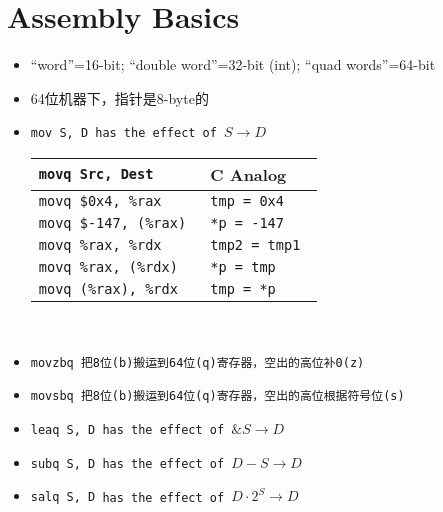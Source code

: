 \section{Assembly Basics}
\begin{itemize}[nosep]
    \item ``word''=16-bit; ``double word''=32-bit (int); ``quad words''=64-bit
    \item 64位机器下，指针是8-byte的
    \item \tt{mov S, D} has the effect of $S \to D$
    
    \begin{tabular}{| l || l |} \hline
        \tt{movq Src, Dest} & C Analog \\ \hline
        \tt{movq \$0x4, \%rax} & \tt{tmp = 0x4} \\ \hline
        \tt{movq \$-147, (\%rax)} & \tt{*p = -147} \\ \hline
        \tt{movq \%rax, \%rdx} & \tt{tmp2 = tmp1} \\ \hline
        \tt{movq \%rax, (\%rdx)} & \tt{*p = tmp} \\ \hline
        \tt{movq (\%rax), \%rdx} & \tt{tmp = *p} \\ \hline
    \end{tabular} \\
    \item \tt{movzbq} 把8位(b)搬运到64位(q)寄存器，空出的高位补0(z)
    \item \tt{movsbq} 把8位(b)搬运到64位(q)寄存器，空出的高位根据符号位(s)
    \item \tt{leaq S, D} has the effect of $\&S \to D$
    \item \tt{subq S, D} has the effect of $D - S \to D$
    \item \tt{salq S, D} has the effect of $D \cdot 2^S \to D$
\end{itemize}
